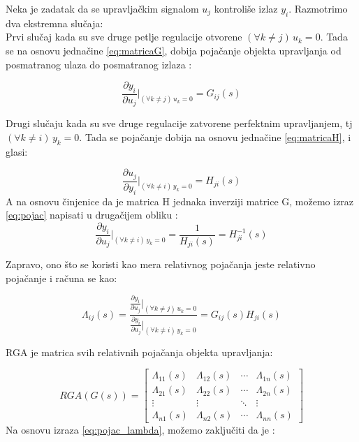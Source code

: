 \documentclass[a4paper,11pt]{article}
\theoremstyle{definition} \newtheorem{deff}{Definicija}[section]
\theoremstyle{definition} \newtheorem{prim}[deff]{Primer}
\theoremstyle{plain} \newtheorem{teor}[deff]{Teorema}
\begin{document}
	Neka je zadatak da se upravljačkim signalom 
	$u_j$ kontroliše izlaz $y_i$. Razmotrimo dva ekstremna slučaja: \\
	
	Prvi slučaj kada su sve druge petlje regulacije otvorene $(\forall k \neq j) \, u_k = 0$. Tada se na osnovu jednačine 
	\eqref{eq:matricaG}, dobija pojačanje objekta upravljanja od posmatranog ulaza do posmatranog izlaza : 
	
	\begin{equation}
		\frac{{\partial y_i}}{{\partial u_j}} \bigg|_{(\forall k \neq j) \, u_k=0} = G_{ij}(s)
		\label{eq:pojac}
	\end{equation}
	
	Drugi slučaju kada su sve druge regulacije zatvorene perfektnim upravljanjem, tj $(\forall k \neq i) \, y_k = 0$. Tada se pojačanje dobija na osnovu jednačine \eqref{eq:matricaH}, i glasi: 
	
	\begin{equation}
		\frac{{\partial u_j}}{{\partial y_i}} \bigg|_{(\forall k \neq i) \, y_k=0} = H_{ji}(s)
	\end{equation}
	A na osnovu činjenice da je matrica H jednaka inverziji matrice G, možemo izraz \eqref{eq:pojac} napisati u drugačijem obliku :
	\begin{equation}
		\frac{{\partial y_i}}{{\partial u_j}} \bigg|_{(\forall k \neq i) \, y_k=0} = \frac{1}{{H_{ji}(s)}} = H_{ji}^{-1}(s)
	\end{equation}
	
	Zapravo, ono što se koristi kao mera relativnog pojačanja jeste relativno pojačanje i računa se kao:
	
	\begin{equation}
		\Lambda_{ij}(s) = \frac{{\frac{{\partial y_i}}{{\partial u_j}} \bigg|_{(\forall k \neq j) \, u_k=0}}}{{\frac{{\partial y_i}}{{\partial u_j}} \bigg|_{(\forall k \neq i) \, y_k=0}}} = G_{ij}(s) H_{ji}(s)
		\label{eq:pojac_lambda}
	\end{equation}
	
	RGA je matrica svih relativnih pojačanja objekta upravljanja:
	
	\begin{equation}
		RGA(G(s)) = \begin{bmatrix}
			\Lambda_{11}(s) & \Lambda_{12}(s) & \cdots & \Lambda_{1n}(s) \\
			\Lambda_{21}(s) & \Lambda_{22}(s) & \cdots & \Lambda_{2n}(s) \\
			\vdots & \vdots & \ddots & \vdots \\
			\Lambda_{n1}(s) & \Lambda_{n2}(s) & \cdots & \Lambda_{nn}(s)
		\end{bmatrix}
	\end{equation}
	Na osnovu izraza \eqref{eq:pojac_lambda}, možemo zaključiti da je :
	
\end{document}
